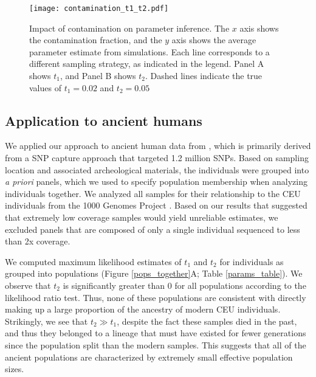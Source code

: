 \documentclass[11pt, oneside]{article}   	%
\begin{document}
\begin{figure}[h] %
   \centering
   \texttt{[image: contamination\_t1\_t2.pdf]} 
   \caption{Impact of contamination on parameter inference. The $x$ axis shows the contamination fraction, and the $y$ axis shows the average parameter estimate from simulations. Each line corresponds to a different sampling strategy, as indicated in the legend. Panel A shows $t_1$, and Panel B shows $t_2$. Dashed lines indicate the true values of $t_1 = 0.02$ and $t_2 = 0.05$}
   \label{contamination}
\end{figure}


\subsection{Application to ancient humans}
We applied our approach to ancient human data from \citet{mathieson2015genome}, which is primarily derived from a SNP capture approach that targeted 1.2 million SNPs. Based on sampling location and associated archeological materials, the individuals were grouped into \emph{a priori} panels, which we used to specify population membership when analyzing individuals together. We analyzed all samples for their relationship to the CEU individuals from the 1000 Genomes Project \citep{10002015global}. Based on our results that suggested that extremely low coverage samples would yield unreliable estimates, we excluded panels that are composed of only a single individual sequenced to less than 2x coverage.

We computed maximum likelihood estimates of $t_1$ and $t_2$ for individuals as grouped into populations (Figure \ref{pops_together}A; Table \ref{params_table}). We observe that $t_2$ is significantly greater than 0 for all populations according to the likelihood ratio test. Thus, none of these populations are consistent with directly making up a large proportion of the ancestry of modern CEU individuals. Strikingly, we see that $t_2 \gg t_1$, despite the fact these samples died in the past, and thus they belonged to a lineage that must have existed for fewer generations since the population split than the modern samples. This suggests that all of the ancient populations are characterized by extremely small effective population sizes.
\end{document}
